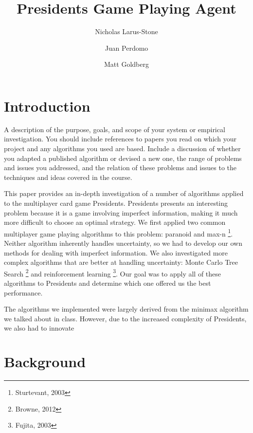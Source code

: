 \documentclass[11pt]{article}
\title{Presidents Game Playing Agent}
\author{Nicholas Larus-Stone \and Juan Perdomo \and Matt Goldberg}
\begin{document}
\maketitle{}


\section{Introduction}

A description of the purpose, goals, and scope of your system or
empirical investigation.  You should include references to papers you
read on which your project and any algorithms you used are
based. Include a discussion of whether you adapted a published
algorithm or devised a new one, the range of problems and issues you
addressed, and the relation of these problems and issues to the
techniques and ideas covered in the course.

This paper provides an in-depth investigation of a number of algorithms applied to the multiplayer card game Presidents. Presidents presents an interesting problem because it is a game involving imperfect information, making it much more difficult to choose an optimal strategy. We first applied two common multiplayer game playing algorithms to this problem: paranoid and max-n \footnote{Sturtevant, 2003}. Neither algorithm inherently handles uncertainty, so we had to develop our own methods for dealing with imperfect information. We also investigated more complex algorithms that are better at handling uncertainty: Monte Carlo Tree Search \footnote{Browne, 2012} and reinforcement learning \footnote{Fujita, 2003}. Our goal was to apply all of these algorithms to Presidents and determine which one offered us the best performance.

The algorithms we implemented were largely derived from the minimax algorithm we talked about in class. However, due to the increased complexity of Presidents, we also had to innovate 

\section{Background}
\end{document}
